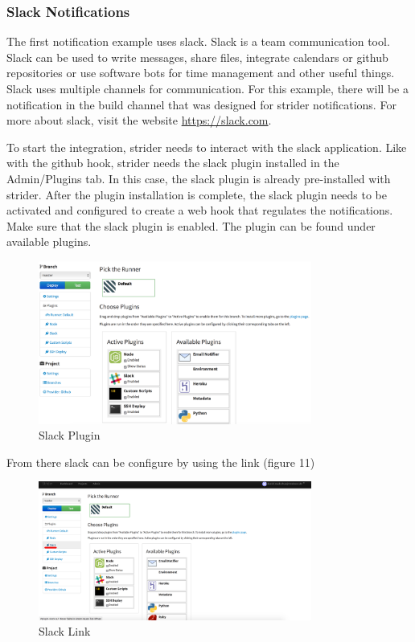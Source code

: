 \subsubsection{Slack Notifications}
The first notification example uses slack. Slack is a team communication tool. Slack can be used to write messages, share files, integrate calendars or
github repositories or use software bots for time management and other useful things. Slack uses multiple channels for communication. For this example, there
will be a notification in the build channel that was designed for strider notifications. For more about slack, visit the website \url{https://slack.com}.

To start the integration, strider needs to interact with the slack application. Like with the github hook, strider needs the slack
plugin installed in the Admin/Plugins tab. In this case, the slack plugin is already pre-installed with strider. After the plugin installation
is complete, the slack plugin needs to be activated and configured to create a web hook that regulates the notifications.
Make sure that the slack plugin is enabled. The plugin can be found under available plugins.

\begin{figure}[h!]
  \centering
  \includegraphics[width=0.8\textwidth]{images/slack.png}
  \caption{Slack Plugin}
\end{figure}

From there slack can be configure by using the link (figure 11)

\begin{figure}[h!]
  \centering
  \includegraphics[width=0.8\textwidth]{images/slack_link.png}
  \caption{Slack Link}
\end{figure}

